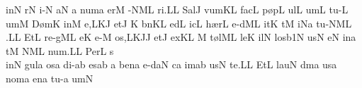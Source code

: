 \divisiominima
\spatium
\sgn {}in\punctum N\egn
\spatium
{}r\punctum N\egn
\sgn {}i-\punctum N\egn
\sgn {}a{}\punctum N\egn
\spatium
\custos a
\lineaproxima
\sgn num\punctum a\egn
\sgn {}er\punctum M\egn
\sgn {}{\a}-\climacus NML\egn
\sgn ri.\punctum L\augmentum L\egn
\spatium
\divisiofinalis
\spatium
\sgn Sal\punctum J\egn
\sgn vum\pes KL\egn
\spatium
\sgn fac\punctum L\egn
\spatium
\sgn p{\o}p\punctum L\egn
\sgn {}ul\punctum L\egn
\sgn {}um\punctum L\egn
\spatium
\sgn tu-\punctum L\egn
\sgn {}um\punctum M\egn
\spatium
\sgn D{\o}m\punctum K\egn
\sgn {}in\punctum M\egn
\sgn {}e,\climacus LKJ\egn
\spatium
\divisiominor
\spatium
\sgn {}et\punctum J\egn
\spatium
\custos K
\lineaproxima
\sgn b{\e}n\pes KL\egn
\sgn {}ed\punctum L\egn
\sgn {}ic\punctum L\egn
\spatium
\sgn h{\ae}r\punctum L\egn
\sgn {}e{-d}\clivis ML\egn
\sgn {}it\punctum K\egn
\sgn {}{\a}t\punctum M\egn
\sgn {}i{}\pes Na\egn
\spatium
\sgn tu-\climacus NML\egn
\sgn {}{\ae}.\punctum L\augmentum L\egn
\spatium
\divisiofinalis
\spatium
\sgn {}Et\punctum L\egn
\spatium
\sgn re{-g}\clivis ML\egn
\sgn {}e{}\punctum K\egn
\spatium
\sgn {}e-\punctum M\egn
\sgn {}o{s,}\climacus LKJ\augmentum J\egn
\spatium
\divisiominor
\spatium
\sgn {}et\punctum J\egn
\spatium
\sgn {}ex\pes KL\egn
\custos M
\lineaproxima
\sgn t{\o}l\cephalicus ML\egn
\sgn le{}\punctum K\egn
\spatium
\sgn {}il\punctum N\egn
\sgn los\episem b1\punctum N\egn
\spatium
\divisiominima
\spatium
\sgn {}us\punctum N\egn
{}e{}\punctum N\egn
\spatium
\sgn {}in\punctum a\egn
\spatium
\sgn {}{\ae}t\punctum M\egn
{}\climacus NML\egn
\sgn nu{m.}\punctum L\augmentum L\egn
\spatium
\divisiofinalis
\spatium
\sgn Per\punctum L\egn
\spatium
\sgn s{\\i}n\punctum N\egn
\sgn gul\punctum a\egn
\sgn {}os\punctum a\egn
\spatium
\sgn di-\pes ab\egn
\sgn {}es\punctum a\augmentum b\egn
\spatium
\divisiominor
\spatium
\custos a
\lineaproxima
\sgn ben\punctum a\egn
\sgn {}e{-d}\clivis aN\egn
\sgn {}{\\i}c\punctum a\egn
\sgn {}im\pes ab\egn
\sgn {}us\bivirga N\egn
\spatium
\sgn te.\punctum L\augmentum L\egn
\spatium
\divisiofinalis
\spatium
\sgn {}Et\punctum L\egn
\spatium
\sgn lau\punctum N\egn
\sgn d{\a}m\punctum a\egn
\sgn {}us\punctum a\egn
\spatium
\sgn nom\punctum a\egn
\sgn {}en\punctum a\egn
\spatium
\sgn tu-\punctum a\egn
\sgn {}um\punctum N\egn
